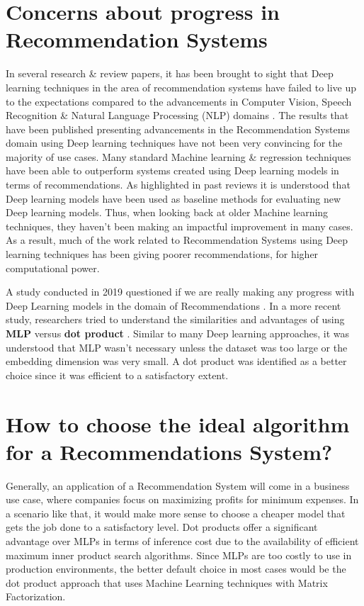 \documentclass[manuscript,screen,review]{acmart}
\begin{document}
\section{Concerns about progress in Recommendation Systems}
In several research \& review papers, it has been brought to sight that Deep learning techniques in the area of recommendation systems have failed to live up to the expectations compared to the advancements in Computer Vision, Speech Recognition \& Natural Language Processing (NLP) domains \cite{choi_local_2021}. The results that have been published presenting advancements in the Recommendation Systems domain using Deep learning techniques have not been very convincing for the majority of use cases. Many standard Machine learning \& regression techniques have been able to outperform systems created using Deep learning models in terms of recommendations. As highlighted in past reviews \cite{dacrema_are_2019} it is understood that Deep learning models have been used as baseline methods for evaluating new Deep learning models. Thus, when looking back at older Machine learning techniques, they haven't been making an impactful improvement in many cases. As a result, much of the work related to Recommendation Systems using Deep learning techniques has been giving poorer recommendations, for higher computational power.


A study conducted in 2019 questioned if we are really making any progress with Deep Learning models in the domain of Recommendations \cite{dacrema_are_2019}. In a more recent study, researchers tried to understand the similarities and advantages of using \textbf{MLP} versus \textbf{dot product} \cite{rendle_neural_2020}. Similar to many Deep learning approaches, it was understood that MLP wasn't necessary unless the dataset was too large or the embedding dimension was very small. A dot product was identified as a better choice since it was efficient to a satisfactory extent.

\section{How to choose the ideal algorithm for a Recommendations System?}

Generally, an application of a Recommendation System will come in a business use case, where companies focus on maximizing profits for minimum expenses. In a scenario like that, it would make more sense to choose a cheaper model that gets the job done to a satisfactory level. Dot products offer a significant advantage over MLPs in terms of inference cost due to the availability of efficient maximum inner product search algorithms. Since MLPs are too costly to use in production environments, the better default choice in most cases would be the dot product approach that uses Machine Learning techniques with Matrix Factorization.
\end{document}
